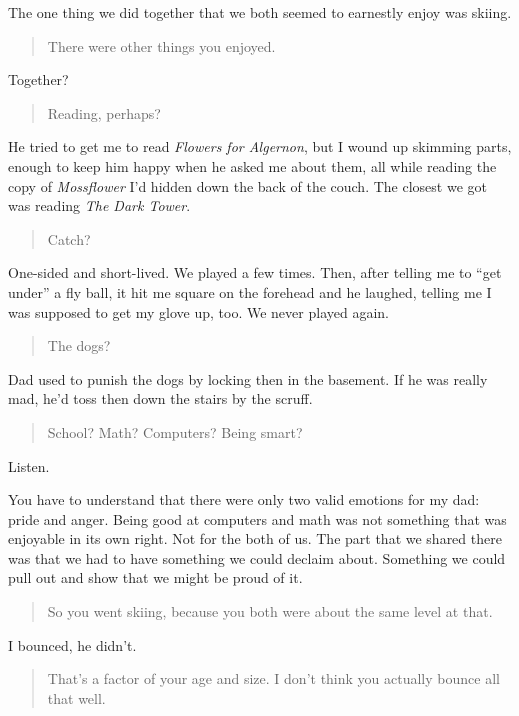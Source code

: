 The one thing we did together that we both seemed to earnestly enjoy was skiing.

\begin{quote}
There were other things you enjoyed.
\end{quote}

Together?

\begin{quote}
Reading, perhaps?
\end{quote}

He tried to get me to read \emph{Flowers for Algernon}, but I wound up skimming parts, enough to keep him happy when he asked me about them, all while reading the copy of \emph{Mossflower} I'd hidden down the back of the couch. The closest we got was reading \emph{The Dark Tower}.

\begin{quote}
Catch?
\end{quote}

One-sided and short-lived. We played a few times. Then, after telling me to ``get under'' a fly ball, it hit me square on the forehead and he laughed, telling me I was supposed to get my glove up, too. We never played again.

\begin{quote}
The dogs?
\end{quote}

Dad used to punish the dogs by locking then in the basement. If he was really mad, he'd toss then down the stairs by the scruff.

\begin{quote}
School? Math? Computers? Being smart?
\end{quote}

Listen.

You have to understand that there were only two valid emotions for my dad: pride and anger. Being good at computers and math was not something that was enjoyable in its own right. Not for the both of us. The part that we shared there was that we had to have something we could declaim about. Something we could pull out and show that we might be proud of it.

\begin{quote}
So you went skiing, because you both were about the same level at that.
\end{quote}

I bounced, he didn't.

\begin{quote}
That's a factor of your age and size. I don't think you actually bounce all that well.
\end{quote}

